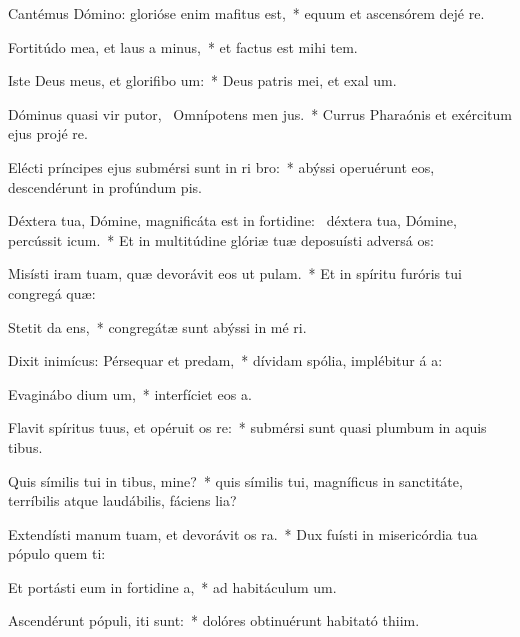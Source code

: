 \item Cantémus Dómino: glorióse enim mafitus est,~* equum et ascensórem dejé  re.
\item Fortitúdo mea, et laus a minus,~* et factus est mihi  tem.
\item Iste Deus meus, et glorifibo um:~* Deus patris mei, et exal um.
\item Dóminus quasi vir putor,~\pscross{} Omnípotens men jus.~* Currus Pharaónis et exércitum ejus projé  re.
\item Elécti príncipes ejus submérsi sunt in ri bro:~* abýssi operuérunt eos, descendérunt in profúndum  pis.
\item Déxtera tua, Dómine, magnificáta est in fortidine:~\pscross{} déxtera tua, Dómine, percússit icum.~* Et in multitúdine glóriæ tuæ deposuísti adversá os:
\item Misísti iram tuam, quæ devorávit eos ut pulam.~* Et in spíritu furóris tui congregá  quæ:
\item Stetit da ens,~* congregátæ sunt abýssi in mé ri.
\item Dixit inimícus: Pérsequar et predam,~* dívidam spólia, implébitur á a:
\item Evaginábo dium um,~* interfíciet eos  a.
\item Flavit spíritus tuus, et opéruit os re:~* submérsi sunt quasi plumbum in aquis tibus.
\item Quis símilis tui in tibus, mine?~* quis símilis tui, magníficus in sanctitáte, terríbilis atque laudábilis, fáciens lia?
\item Extendísti manum tuam, et devorávit os ra.~* Dux fuísti in misericórdia tua pópulo quem ti:
\item Et portásti eum in fortidine a,~* ad habitáculum  um.
\item Ascendérunt pópuli,  iti sunt:~* dolóres obtinuérunt habitató thiim.
